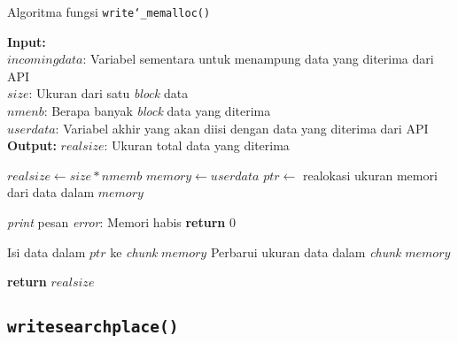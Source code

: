 \begin{algorithm}[h]
	\caption{\textendash\xspace Algoritma fungsi \texttt{write\char`_memalloc()}}
	\label{alg:design-write-memalloc}
	\vspace{-0.6\baselineskip}
	\begin{flushleft}
		\textbf{Input:} \\
		\hspace{1.1em}\textendash\xspace $incomingdata$: Variabel sementara untuk menampung data yang diterima dari API \\
		\hspace{1.1em}\textendash\xspace $size$: Ukuran dari satu \textit{block} data \\
		\hspace{1.1em}\textendash\xspace $nmenb$: Berapa banyak \textit{block} data yang diterima \\
		\hspace{1.1em}\textendash\xspace $userdata$: Variabel akhir yang akan diisi dengan data yang diterima dari API \\
		\textbf{Output:} $realsize$: Ukuran total data yang diterima \\
	\end{flushleft}
	\vspace{-1.05\baselineskip}
	\begin{algorithmic}
		\State $realsize \gets size * nmemb$  
		\State $memory \gets userdata$ 
		\State $ptr \gets$ realokasi ukuran memori dari data dalam $memory$
		
		 
			\State \textit{print} pesan \textit{error}: Memori habis
			\State \textbf{return} $0$ 
		\EndIf
		
		\State Isi data dalam $ptr$ ke \textit{chunk} $memory$
		\State Perbarui ukuran data dalam \textit{chunk} $memory$
		
		\State \textbf{return} $realsize$ 
	\end{algorithmic}
\end{algorithm}

\subsection{\texttt{write\textunderscore searchplace()}}
\label{sec:design-code-write-searchplace}

